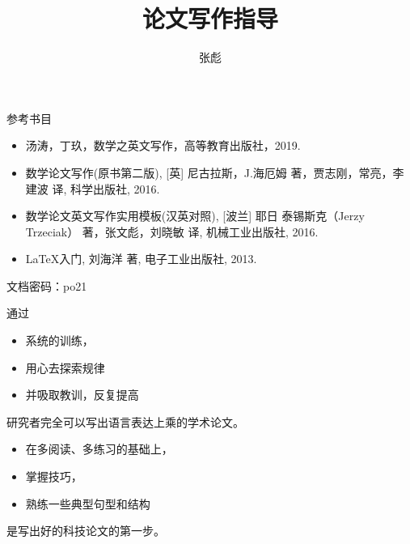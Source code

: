\documentclass[13pt]{ctexbeamer}
\begin{document}
\title[]{论文写作指导 }
\author[]{{\large 张彪} }

\date{}


%



\begin{frame}
\maketitle
\end{frame}



\begin{frame}{参考书目}

	\begin{itemize}
	\item 汤涛，丁玖，数学之英文写作，高等教育出版社，2019. 

	\item  数学论文写作(原书第二版), [英] 尼古拉斯，J.海厄姆 著，贾志刚，常亮，李建波 译, 科学出版社, 2016. 

	\item \alert{数学论文英文写作实用模板(汉英对照)}, [波兰] 耶日 泰锡斯克（Jerzy Trzeciak） 著，张文彪，刘晓敏 译, 机械工业出版社, 2016. 

	\item LaTeX入门, 刘海洋 著, 电子工业出版社, 2013.
	\end{itemize}

	文档密码：po21
\end{frame}

\begin{frame}
	通过
		\begin{itemize}
		\item  系统的训练，
		\item 用心去探索\alert{规律}
		\item 并吸取教训，反复提高
	\end{itemize}
研究者完全可以写出语言表达上乘的学术论文。


\vspace{15pt}

\begin{itemize}
	\item 在多阅读、多练习的基础上，
	\item 掌握\alert{技巧}，
	\item 熟练一些\alert{典型句型}和\alert{结构}
\end{itemize}
是写出好的科技论文的第一步。
\end{frame}
\end{document}
